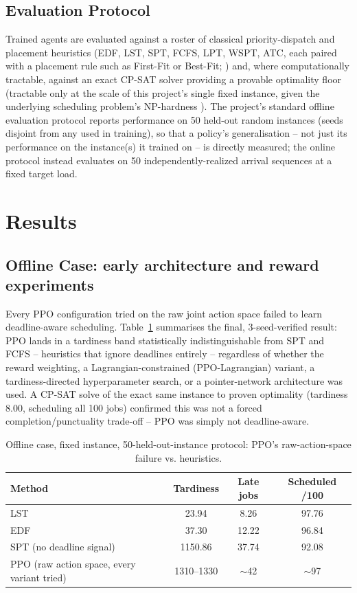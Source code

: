 \documentclass[12pt]{article}
\begin{document}
\subsection{Evaluation Protocol}
Trained agents are evaluated against a roster of classical priority-dispatch and placement heuristics (EDF, LST, SPT, FCFS, LPT, WSPT, ATC, each paired with a placement rule such as First-Fit or Best-Fit; \cite{pinedo2016scheduling,graham1969lpt,smith1956wspt,johnson1973binpacking,grandl2014tetris,vepsalainen1987atc}) and, where computationally tractable, against an exact CP-SAT solver \cite{ortools} providing a provable optimality floor (tractable only at the scale of this project's single fixed instance, given the underlying scheduling problem's NP-hardness \cite{lenstra1977complexity}). The project's standard offline evaluation protocol reports performance on 50 held-out random instances (seeds disjoint from any used in training), so that a policy's generalisation -- not just its performance on the instance(s) it trained on -- is directly measured; the online protocol instead evaluates on 50 independently-realized arrival sequences at a fixed target load.

\section{Results}
\label{sec:results}

\subsection{Offline Case: early architecture and reward experiments}
Every PPO configuration tried on the raw joint action space failed to learn deadline-aware scheduling. Table~\ref{tab:ppo-failure} summarises the final, 3-seed-verified result: PPO lands in a tardiness band statistically indistinguishable from SPT and FCFS -- heuristics that ignore deadlines entirely -- regardless of whether the reward weighting, a Lagrangian-constrained (PPO-Lagrangian) variant, a tardiness-directed hyperparameter search, or a pointer-network architecture was used. A CP-SAT solve of the exact same instance to proven optimality (tardiness 8.00, scheduling all 100 jobs) confirmed this was not a forced completion/punctuality trade-off -- PPO was simply not deadline-aware.

\begin{table}[H]
\centering
\caption{Offline case, fixed instance, 50-held-out-instance protocol: PPO's raw-action-space failure vs. heuristics.}
\label{tab:ppo-failure}
\begin{tabular}{lccc}
\toprule
Method & Tardiness & Late jobs & Scheduled /100 \\
\midrule
LST & 23.94 & 8.26 & 97.76 \\
EDF & 37.30 & 12.22 & 96.84 \\
SPT (no deadline signal) & 1150.86 & 37.74 & 92.08 \\
PPO (raw action space, every variant tried) & 1310--1330 & $\sim$42 & $\sim$97 \\
\bottomrule
\end{tabular}
\end{table}
\end{document}
